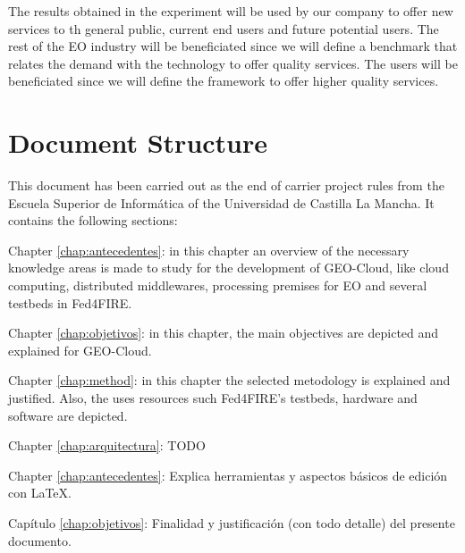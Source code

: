 The results obtained in the experiment will be used by our company to offer new
services to th general public, current end users and future potential users. The
rest of the \acs{EO} industry will be beneficiated since we will define a
benchmark that relates the demand with the technology to offer quality
services. The users will be beneficiated since we will define the framework to
offer higher quality services.




\section{Document Structure}

This document has been carried out as the end of carrier project rules from the Escuela
Superior de Informática of the Universidad de Castilla La Mancha. It contains
the following sections:


\begin{definitionlist}
\item[Chapter \ref{chap:antecedentes}: \nameref{chap:antecedentes}] in this
  chapter an overview of the necessary knowledge areas is made to study for the
  development of GEO-Cloud, like cloud computing, distributed middlewares,
  processing premises for \acs{EO} and several testbeds in Fed4FIRE.
\item[Chapter \ref{chap:objetivos}: \nameref{chap:objetivos}] in this
  chapter, the main objectives are depicted and explained for GEO-Cloud.
\item[Chapter \ref{chap:method}: \nameref{chap:method}] in this chapter the
  selected metodology is explained and justified. Also, the uses resources such
  Fed4FIRE's testbeds, hardware and software are depicted.
\item[Chapter \ref{chap:arquitectura}: \nameref{chap:arquitectura}] TODO
\item[Chapter \ref{chap:antecedentes}: \nameref{chap:antecedentes}] Explica herramientas
  y aspectos básicos de edición con \LaTeX.
\item[Capítulo \ref{chap:objetivos}: \nameref{chap:objetivos}] Finalidad y justificación
  (con todo detalle) del presente documento.
\end{definitionlist}
